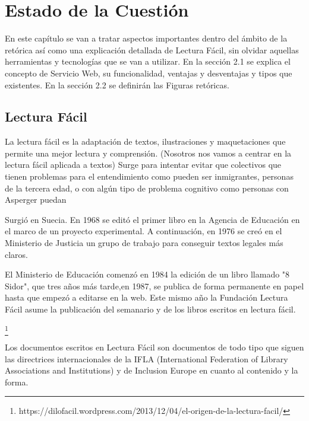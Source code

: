 \chapter{Estado de la Cuestión}
\label{cap:estadoDeLaCuestion}

\begin{resumen}
	En este capítulo se van a tratar aspectos importantes dentro del ámbito de la retórica así como una explicación detallada de Lectura Fácil, sin olvidar aquellas herramientas y tecnologías que se van a utilizar.
	En la sección 2.1 se explica el concepto de Servicio Web, su funcionalidad, ventajas y desventajas y tipos que existentes.
	En la sección 2.2 se definirán las Figuras retóricas.
\end{resumen}



\section{Lectura Fácil}


La lectura fácil es la adaptación de textos, ilustraciones y maquetaciones que permite una mejor lectura y comprensión. (Nosotros nos vamos a centrar en la lectura fácil aplicada a textos) Surge para intentar evitar que colectivos que tienen problemas para el entendimiento como pueden ser inmigrantes, personas de la tercera edad, o con algún tipo de problema cognitivo como personas con Asperger puedan 

Surgió en Suecia. En 1968 se editó el primer libro en la Agencia de Educación en el marco de un proyecto experimental. A continuación, en 1976 se creó en el Ministerio de Justicia un grupo de trabajo para conseguir textos legales más claros.

El Ministerio de Educación comenzó en 1984 la edición de un libro llamado  "8 Sidor", que tres años más tarde,en 1987, se publica de forma permanente en papel hasta que empezó a editarse en la web. Este mismo año la Fundación Lectura Fácil asume la publicación del semanario y de los libros escritos en lectura fácil.


\footnote{https://dilofacil.wordpress.com/2013/12/04/el-origen-de-la-lectura-facil/}

Los documentos escritos en Lectura Fácil son documentos de todo tipo que siguen las directrices internacionales de la IFLA (International Federation of Library Associations and Institutions) y de Inclusion Europe en cuanto al contenido y la forma.

